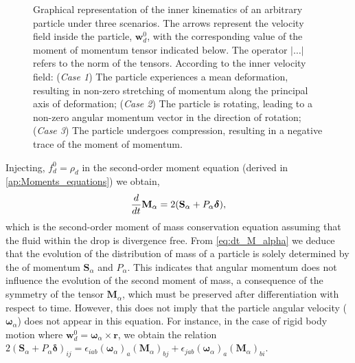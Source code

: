 \begin{figure}[h!]
    \hfill
    \caption{Graphical representation of the inner kinematics   of an arbitrary particle under three scenarios. 
        The arrows represent the velocity field inside the particle, $\textbf{w}_d^0$, with the corresponding value of the moment of momentum tensor indicated below. 
        The operator $|\ldots|$ refers to the norm of the tensors. 
        According to the inner velocity field:
        (\textit{Case 1}) The particle experiences a mean deformation, resulting in non-zero stretching of momentum along the principal axis of deformation;
        (\textit{Case 2}) The particle is rotating, leading to a non-zero angular momentum vector in the direction of rotation;
        (\textit{Case 3}) The particle undergoes compression, resulting in a negative trace of the moment of momentum.
    }
    \label{eq:scheme}
\end{figure}
Injecting, $f_d^0 = \rho_d$ in the second-order moment equation (derived in \ref{ap:Moments_equations}) we obtain,
\begin{equation}
    \ddt {\textbf{M}_\alpha}=2(\textbf{S}_\alpha+P_\alpha\bm\delta),
    \label{eq:dt_M_alpha}
\end{equation}
which is the second-order moment of mass conservation equation assuming that the fluid within the drop is divergence free. 
From \ref{eq:dt_M_alpha} we deduce that the evolution of the distribution of mass of a particle is solely determined by the  of momentum $\textbf{S}_\alpha$ and $P_\alpha$. 
This indicates that angular momentum does not influence the evolution of the second moment of mass, a consequence of the symmetry of the tensor $\textbf{M}_\alpha$, which must be preserved after differentiation with respect to time.
However, this does not imply that the particle angular velocity ($\bm\omega_\alpha$) does not appear in this equation. 
For instance, in the case of rigid body motion where $\textbf{w}_d^0 = \bm\omega_\alpha \times \textbf{r}$, we obtain the relation  $2(\textbf{S}_\alpha+P_\alpha\bm\delta)_{ij} = \epsilon_{iab} (\bm\omega_\alpha)_a (\textbf{M}_\alpha)_{bj}+ 
\epsilon_{jab} (\bm\omega_\alpha)_a (\textbf{M}_\alpha)_{bi}  $. 


